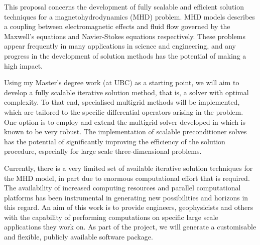 \documentclass[12pt]{article}
\numberwithin{equation}{section}    %
\begin{document}
\pagestyle{fancyplain}
\fancyhead{}
\fancyfoot{} %
\fancyfoot[LE,RO]{\thepage \hspace{-5mm}}
\fancyfoot[CO,RE]{}

{}

\bigskip



This proposal concerns the development of fully scalable and efficient solution techniques for a magnetohydrodynamics (MHD) problem. MHD models describes a coupling between electromagnetic effects and fluid flow governed by the  Maxwell’s equations and Navier-Stokes equations respectively. These problems appear frequently in many applications in science and engineering, and any progress in the development of solution methods has the potential of making a high impact.

\smallskip

Using my Master's degree work (at UBC) as a starting point, we will aim to develop a fully scalable iterative solution method, that is, a solver with optimal complexity. To that end, specialised multigrid methods will be implemented, which are tailored to the specific differential operators arising in the problem. One option is to employ and extend the multigrid solver developed in \cite{hiptmair2007nodal} {which is known to be very robust}. The implementation of scalable preconditioner solves has the potential of significantly improving the efficiency of the solution procedure, especially for large scale three-dimensional problems.
\smallskip


Currently, there is a very limited set of available iterative solution techniques for the MHD model, in part due to enormous computational effort that is required. The availability of increased computing resources and parallel computational platforms has been instrumental in generating new possibilities and horizons in this regard. An aim of this work is to provide  engineers, geophysicists and others with the capability of performing computations on specific large scale applications they work on. As part of the project, we will generate a customisable and flexible, publicly available software package.
\smallskip
\end{document}
